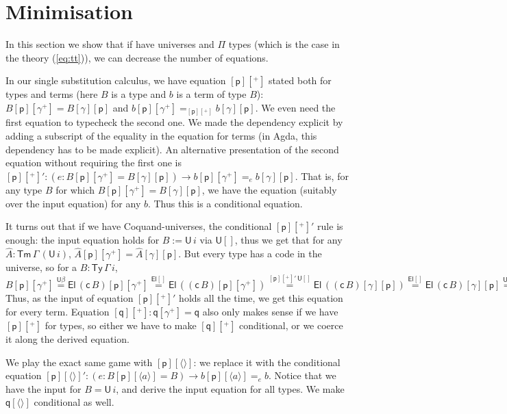 \documentclass[submission,copyright,creativecommons]{eptcs}
\newcommand{\ra}{\rightarrow}
\newcommand{\Ty}{\mathsf{Ty}}
\newcommand{\Tm}{\mathsf{Tm}}
\newcommand{\p}{\mathsf{p}}
\newcommand{\q}{\mathsf{q}}
\newcommand{\U}{\mathsf{U}}
\newcommand{\El}{\mathsf{El}}
\newcommand{\cd}{\mathsf{c}}
\begin{document}
\section{Minimisation}
\label{sec:minimisation}

In this section we show that if have universes and $\Pi$ types
(which is the case in the theory (\ref{eq:tt})), we can decrease the
number of equations.

In our single substitution calculus, we have equation $[\p][^+]$
stated both for types and terms (here $B$ is a type and $b$ is a term of type $B$):
$B[\p][\gamma^+] = B[\gamma][\p]$ and $b[\p][\gamma^+] =_{[\p][^+]} b[\gamma][\p]$. 
We even need the first equation to typecheck the second one. We made
the dependency explicit by adding a subscript of the equality in the
equation for terms (in Agda, this dependency has to be made
explicit). An alternative presentation of the second equation without
requiring the first one is
$
[\p][^+]' : (e : B[\p][\gamma^+] = B[\gamma][\p])\ra b[\p][\gamma^+] =_{e} b[\gamma][\p].
$
That is, for any type $B$ for which $B[\p][\gamma^+] = B[\gamma][\p]$,
we have the equation (suitably over the input
equation) for any $b$. Thus this is a conditional equation.

It turns out that if we have Coquand-universes, the conditional
$[\p][^+]'$ rule is enough: the input equation holds for $B := \U\,i$
via $\U[]$, thus we get that for any $\hat{A} : \Tm\,\Gamma\,(\U\,i)$,
$\hat{A}[\p][\gamma^+] = \hat{A}[\gamma][\p]$. But every type has a
code in the universe, so for a $B : \Ty\,\Gamma\,i$,
$
B[\p][\gamma^+] \overset{\U\beta}{=}
\El\,(\cd\,B)[\p][\gamma^+] \overset{\El[]}{=}
\El\,((\cd\,B)[\p][\gamma^+]) \overset{[\p][^+]'\,\U[]}{=}
\El\,((\cd\,B)[\gamma][\p]) \overset{\El[]}{=}
\El\,(\cd\,B)[\gamma][\p] \overset{\U\beta}{=}
B[\gamma][\p].
$
Thus, as the input of equation $[\p][^+]'$ holds all the time, we get this equation for every term.
Equation $[\q][^+] : \q[\gamma^+] = \q$ also only makes sense if we
have $[\p][^+]$ for types, so either we have to make $[\q][^+]$
conditional, or we coerce it along the derived equation.

We play the exact same game with $[\p][\langle\rangle]$: we replace it
with the conditional equation
$
[\p][\langle\rangle]' : (e:B[\p][\langle a\rangle] = B)\ra b[\p][\langle a\rangle] =_e b.
$
Notice that we have the input for $B = \U\,i$, and derive the input
equation for all types. We make $\q[\langle\rangle]$ conditional as
well.
\end{document}
